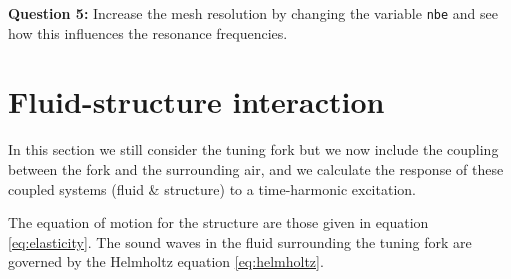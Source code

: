 \documentclass[english,3p]{elsarticle}
\newcommand{\code}[1]{\texttt{#1}}
\begin{document}
\textbf{Question 5:} Increase the mesh resolution by changing the variable \code{nbe} and see how this influences the resonance frequencies.


\section{Fluid-structure interaction}

In this section we still consider the tuning fork but we now include the coupling between the fork and the surrounding air, and we calculate the response of these coupled systems (fluid \& structure) to a time-harmonic excitation.

The equation of motion for the structure are those given in equation \eqref{eq:elasticity}.
The sound waves in the fluid surrounding the tuning fork are governed by the Helmholtz equation \eqref{eq:helmholtz}.
\end{document}
